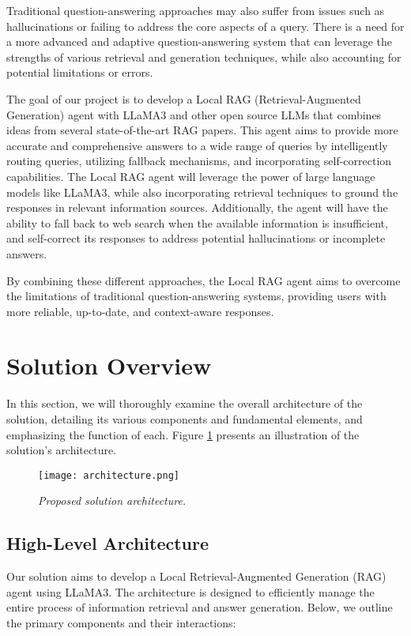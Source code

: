 Traditional question-answering approaches may also suffer from issues such as hallucinations \cite{zhang2023sirens} or failing to address the core aspects of a query. There is a need for a more advanced and adaptive question-answering system that can leverage the strengths of various retrieval and generation techniques, while also accounting for potential limitations or errors.

The goal of our project is to develop a Local RAG (Retrieval-Augmented Generation) agent with LLaMA3 and other open source LLMs that combines ideas from several state-of-the-art RAG papers. This agent aims to provide more accurate and comprehensive answers to a wide range of queries by intelligently routing queries, utilizing fallback mechanisms, and incorporating self-correction capabilities. The Local RAG agent will leverage the power of large language models like LLaMA3, while also incorporating retrieval techniques to ground the responses in relevant information sources. Additionally, the agent will have the ability to fall back to web search when the available information is insufficient, and self-correct its responses to address potential hallucinations or incomplete answers.

By combining these different approaches, the Local RAG agent aims to overcome the limitations of traditional question-answering systems, providing users with more reliable, up-to-date, and context-aware responses.

\section{Solution Overview}

In this section, we will thoroughly examine the overall architecture of the solution, detailing its various components and fundamental elements, and emphasizing the function of each. Figure \ref{fig:architecture} presents an illustration of the solution's architecture.

\begin{figure}[!ht]
    \centering
    \texttt{[image: architecture.png]}
    \caption{\it{Proposed solution architecture.}}
    \label{fig:architecture}
\end{figure}

\subsection{High-Level Architecture}

Our solution aims to develop a Local Retrieval-Augmented Generation (RAG) agent using LLaMA3. The architecture is designed to efficiently manage the entire process of information retrieval and answer generation. Below, we outline the primary components and their interactions:

